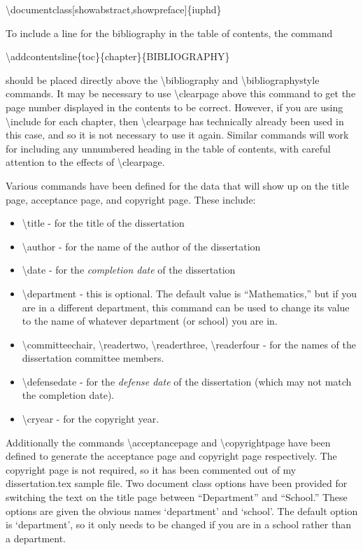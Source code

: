 \documentclass{iuphd}
\begin{document}
\textbackslash documentclass[showabstract,showpreface]\{iuphd\}
\medskip

\noindent To include a line for the bibliography in the table of contents, the command
\medskip

\textbackslash addcontentsline\{toc\}\{chapter\}\{BIBLIOGRAPHY\}
\medskip

\noindent should be placed directly above the \textbackslash bibliography and \textbackslash bibliographystyle commands.  It may be necessary
to use \textbackslash clearpage above this command to get the page number displayed in the contents to be correct.  However, if you are using
\textbackslash include for each chapter, then \textbackslash clearpage has technically already been used in this case, and so it is not
necessary to use it again. Similar commands will work for including any unnumbered heading in the table of contents, with careful attention
to the effects of \textbackslash clearpage.

Various commands have been defined for the data that will show up on the title page, acceptance page, and copyright page.  These include:
\begin{itemize}
 \item \textbackslash title - for the title of the dissertation
 \item \textbackslash author - for the name of the author of the dissertation
 \item \textbackslash date - for the \emph{completion date} of the dissertation
 \item \textbackslash department - this is optional.  The default value is ``Mathematics,'' but if you are in a different department, this
        command can be used to change its value to the name of whatever department (or school) you are in.  
 \item \textbackslash committeechair, \textbackslash readertwo, \textbackslash readerthree, \textbackslash readerfour - for the names of the
                      dissertation committee members.
 \item \textbackslash defensedate - for the \emph{defense date} of the dissertation (which may not match the completion date).
 \item \textbackslash cryear - for the copyright year.
\end{itemize}

Additionally the commands \textbackslash acceptancepage and \textbackslash copyrightpage have been defined to generate the acceptance page and copyright page
respectively.  The copyright page is not required, so it has been commented out of my dissertation.tex sample file.  Two document class options have been provided
for switching the text on the title page between ``Department'' and ``School.''  These options are given the obvious names `department' and `school'. The
default option is `department', so it only needs to be changed if you are in a school rather than a department.
\end{document}
